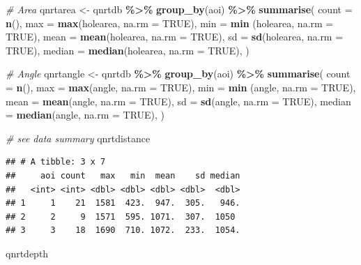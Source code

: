\documentclass[
]{article}
\newenvironment{Shaded}{\begin{snugshade}}{\end{snugshade}}
\newcommand{\AttributeTok}[1]{\textcolor[rgb]{0.13,0.29,0.53}{#1}}
\newcommand{\CommentTok}[1]{\textcolor[rgb]{0.56,0.35,0.01}{\textit{#1}}}
\newcommand{\ConstantTok}[1]{\textcolor[rgb]{0.56,0.35,0.01}{#1}}
\newcommand{\FunctionTok}[1]{\textcolor[rgb]{0.13,0.29,0.53}{\textbf{#1}}}
\newcommand{\NormalTok}[1]{#1}
\newcommand{\OtherTok}[1]{\textcolor[rgb]{0.56,0.35,0.01}{#1}}
\newcommand{\SpecialCharTok}[1]{\textcolor[rgb]{0.81,0.36,0.00}{\textbf{#1}}}
\begin{document}
\begin{Shaded}
\begin{Highlighting}[]
\CommentTok{\# Area}
\NormalTok{qnrtarea }\OtherTok{\textless{}{-}}\NormalTok{ qnrtdb }\SpecialCharTok{\%\textgreater{}\%} \FunctionTok{group\_by}\NormalTok{(aoi) }\SpecialCharTok{\%\textgreater{}\%}
      \FunctionTok{summarise}\NormalTok{(}
      \AttributeTok{count =} \FunctionTok{n}\NormalTok{(),}
      \AttributeTok{max =} \FunctionTok{max}\NormalTok{(holearea, }\AttributeTok{na.rm =} \ConstantTok{TRUE}\NormalTok{),}
      \AttributeTok{min =} \FunctionTok{min}\NormalTok{ (holearea, }\AttributeTok{na.rm =} \ConstantTok{TRUE}\NormalTok{),}
      \AttributeTok{mean =} \FunctionTok{mean}\NormalTok{(holearea, }\AttributeTok{na.rm =} \ConstantTok{TRUE}\NormalTok{),}
      \AttributeTok{sd =} \FunctionTok{sd}\NormalTok{(holearea, }\AttributeTok{na.rm =} \ConstantTok{TRUE}\NormalTok{),}
      \AttributeTok{median =} \FunctionTok{median}\NormalTok{(holearea, }\AttributeTok{na.rm =} \ConstantTok{TRUE}\NormalTok{),}
\NormalTok{  ) }

\CommentTok{\# Angle}
\NormalTok{qnrtangle }\OtherTok{\textless{}{-}}\NormalTok{ qnrtdb }\SpecialCharTok{\%\textgreater{}\%} \FunctionTok{group\_by}\NormalTok{(aoi) }\SpecialCharTok{\%\textgreater{}\%}
      \FunctionTok{summarise}\NormalTok{(}
      \AttributeTok{count =} \FunctionTok{n}\NormalTok{(),}
      \AttributeTok{max =} \FunctionTok{max}\NormalTok{(angle, }\AttributeTok{na.rm =} \ConstantTok{TRUE}\NormalTok{),}
      \AttributeTok{min =} \FunctionTok{min}\NormalTok{ (angle, }\AttributeTok{na.rm =} \ConstantTok{TRUE}\NormalTok{),}
      \AttributeTok{mean =} \FunctionTok{mean}\NormalTok{(angle, }\AttributeTok{na.rm =} \ConstantTok{TRUE}\NormalTok{),}
      \AttributeTok{sd =} \FunctionTok{sd}\NormalTok{(angle, }\AttributeTok{na.rm =} \ConstantTok{TRUE}\NormalTok{),}
      \AttributeTok{median =} \FunctionTok{median}\NormalTok{(angle, }\AttributeTok{na.rm =} \ConstantTok{TRUE}\NormalTok{),}
\NormalTok{  ) }

\CommentTok{\# see data summary}
\NormalTok{qnrtdistance}
\end{Highlighting}
\end{Shaded}

\begin{verbatim}
## # A tibble: 3 x 7
##     aoi count   max   min  mean    sd median
##   <int> <int> <dbl> <dbl> <dbl> <dbl>  <dbl>
## 1     1    21  1581  423.  947.  305.   946.
## 2     2     9  1571  595. 1071.  307.  1050 
## 3     3    18  1690  710. 1072.  233.  1054.
\end{verbatim}

\begin{Shaded}
\begin{Highlighting}[]
\NormalTok{qnrtdepth}
\end{Highlighting}
\end{Shaded}
\end{document}

